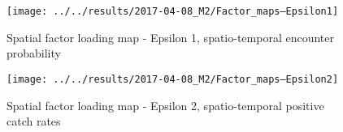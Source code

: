 \documentclass[11pt]{article}
\begin{document}
\begin{figure}[!ht]
	\texttt{[image: ../../results/2017-04-08\_M2/Factor\_maps--Epsilon1]}
	\label{fig:FactMap3}
	\caption{Spatial factor loading map - Epsilon 1, spatio-temporal encounter probability}
\end{figure}

\begin{figure}[!ht]
	\texttt{[image: ../../results/2017-04-08\_M2/Factor\_maps--Epsilon2]}
	\label{fig:FactMap4}
	\caption{Spatial factor loading map - Epsilon 2, spatio-temporal positive catch rates}
\end{figure}


\end{document}
